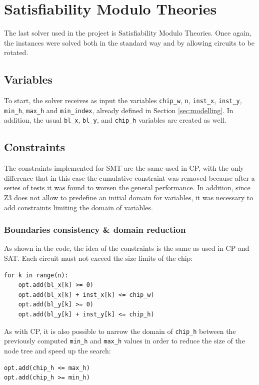 \documentclass[a4paper, 12pt]{article}
\begin{document}
\clearpage

\section{Satisfiability Modulo Theories}

The last solver used in the project is Satisfiability Modulo Theories. Once again, the instances were solved both in the standard way and by allowing circuits to be rotated.

\subsection{Variables}
To start, the solver receives as input the variables \verb|chip_w|, \verb|n|, \verb|inst_x|, \verb|inst_y|, \verb|min_h|, \verb|max_h| and \verb|min_index|, already defined in Section \ref{sec:modelling}. In addition, the usual \verb|bl_x|, \verb|bl_y|, and \verb|chip_h| variables are created as well. 

\subsection{Constraints}
The constraints implemented for SMT are the same used in CP, with the only difference that in this case the cumulative constraint was removed because after a series of tests it was found to worsen the general performance. In addition, since Z3 does not allow to predefine an initial domain for variables, it was necessary to add constraints limiting the domain of variables.
\subsubsection{Boundaries consistency \& domain reduction}
As shown in the code, the idea of the constraints is the same as used in CP and SAT. Each circuit must not exceed the size limits of the chip:
\begin{verbatim}
for k in range(n):
    opt.add(bl_x[k] >= 0)
    opt.add(bl_x[k] + inst_x[k] <= chip_w)
    opt.add(bl_y[k] >= 0)
    opt.add(bl_y[k] + inst_y[k] <= chip_h)
\end{verbatim}

As with CP, it is also possible to narrow the domain of \verb|chip_h| between the previously computed \verb|min_h| and \verb|max_h| values in order to reduce the size of the node tree and speed up the search:
\begin{verbatim}
opt.add(chip_h <= max_h)
opt.add(chip_h >= min_h)
\end{verbatim}
\end{document}
